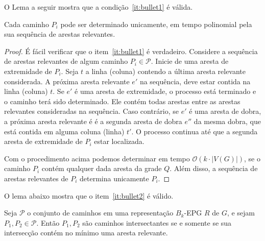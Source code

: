 O Lema a seguir mostra que a condição~\ref{it:bullet1} é válida.

\begin{lema}\label{lem:verify1}
Cada caminho $P_i$ pode ser determinado unicamente, em tempo polinomial pela sua sequência de arestas relevantes.
\end{lema}

\begin{proof}
É fácil verificar que o item~\ref{it:bullet1} é verdadeiro. Considere a sequência de arestas relevantes de algum caminho $P_i\in \mathcal{P}$. Inicie de uma aresta de extremidade de $P_i$. Seja   $t$ a linha (coluna) contendo a última aresta relevante considerada. A próxima aresta relevante  $e'$ na sequência, deve estar contida na linha (coluna) $t$. Se $e'$ é uma aresta de extremidade, o processo está terminado e o caminho terá sido determinado. Ele contém todas arestas entre as arestas relevantes consideradas na sequência.  Caso contrário, se  $e'$ é uma aresta de dobra, a próxima aresta relevante é é a segunda aresta de dobra  $e''$ da mesma dobra, que está contida em alguma coluna (linha) $t'$. O processo continua até que a segunda aresta de extremidade de $P_i$ estar localizada.   

Com o procedimento acima podemos determinar em tempo $\mathcal{O}(k\cdot |V(G)|)$, se o caminho $P_i$ contém qualquer dada aresta da grade $Q$. Além disso, a sequência de arestas relevantes de  $P_i$ determina unicamente  $P_i$.
 \end{proof} %

O lema abaixo mostra que o item~\ref{it:bullet2} é válido.

\begin{lema}\label{lem:relevantEdges}
Seja $\mathcal{P}$ o conjunto de caminhos em uma representação $B_k$-EPG $R$ de $G$, e sejam $P_1,P_2 \in \mathcal{P}$. Então $P_1, P_2$ são caminhos intersectantes se e somente se sua intersecção contém no mínimo uma aresta relevante.%
\end{lema}

